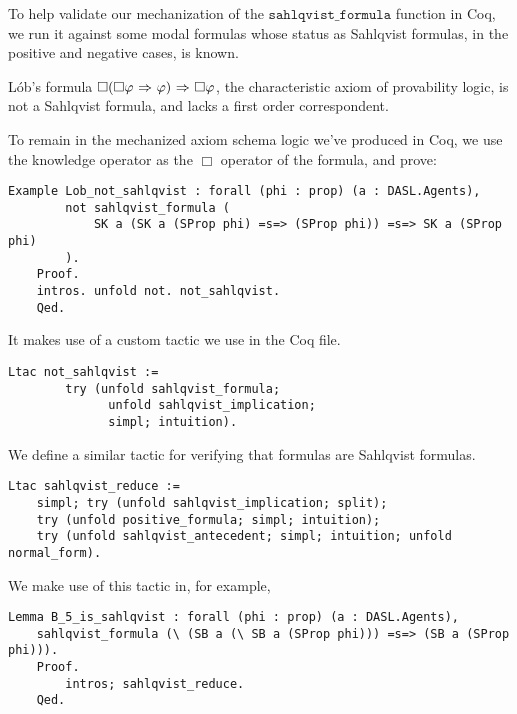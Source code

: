 To help validate our mechanization of the $\mathtt{sahlqvist\_formula}$ function in Coq, we run it against some modal formulas whose status as Sahlqvist formulas, in the positive and negative cases, is known.

L\'ob's formula $\Box(\Box \varphi {\ \Rightarrow \ } \varphi) {\ \Rightarrow \ } \Box \varphi$, the characteristic axiom of provability logic, is not a Sahlqvist formula, and lacks a first order correspondent\cite{Boolos}.

To remain in the mechanized axiom schema logic we've produced in Coq, we use the knowledge operator as the $\Box$ operator of the formula, and prove:

\begin{tcolorbox}
	\begin{lstlisting}[language=Coq]
	Example Lob_not_sahlqvist : forall (phi : prop) (a : DASL.Agents),
		not sahlqvist_formula (
			SK a (SK a (SProp phi) =s=> (SProp phi)) =s=> SK a (SProp phi)
		).
	Proof.
	intros. unfold not. not_sahlqvist. 
	Qed.
	\end{lstlisting}
\end{tcolorbox}

It makes use of a custom tactic we use in the Coq file.

\begin{tcolorbox}
	\begin{lstlisting}[language=Coq]
	Ltac not_sahlqvist := 
		try (unfold sahlqvist_formula; 
			  unfold sahlqvist_implication; 
			  simpl; intuition).
	\end{lstlisting}
\end{tcolorbox}

We define a similar tactic for verifying that formulas are Sahlqvist formulas.

\begin{tcolorbox}
	\begin{lstlisting}[language=Coq]
	Ltac sahlqvist_reduce := 
	simpl; try (unfold sahlqvist_implication; split);
	try (unfold positive_formula; simpl; intuition);
	try (unfold sahlqvist_antecedent; simpl; intuition; unfold normal_form).
	\end{lstlisting}
\end{tcolorbox}

We make use of this tactic in, for example,

\begin{tcolorbox}
	\begin{lstlisting}[language=Coq]
	Lemma B_5_is_sahlqvist : forall (phi : prop) (a : DASL.Agents),
	sahlqvist_formula (\ (SB a (\ SB a (SProp phi))) =s=> (SB a (SProp phi))).
	Proof.
		intros; sahlqvist_reduce. 
	Qed.
	\end{lstlisting}
\end{tcolorbox}


